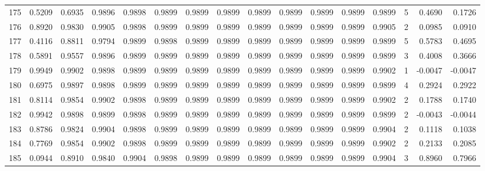 \begin{tabular}{lrrrrrrrrrrrrrrr}
175 &      0.5209 &  0.6935 &  0.9896 &  0.9898 &  0.9899 &  0.9899 &  0.9899 &  0.9899 &  0.9899 &  0.9899 &   0.9899 &     0.9899 &      5 &                    0.4690 &                     0.1726 \\
176 &      0.8920 &  0.9830 &  0.9905 &  0.9898 &  0.9899 &  0.9899 &  0.9899 &  0.9899 &  0.9899 &  0.9899 &   0.9899 &     0.9905 &      2 &                    0.0985 &                     0.0910 \\
177 &      0.4116 &  0.8811 &  0.9794 &  0.9899 &  0.9898 &  0.9899 &  0.9899 &  0.9899 &  0.9899 &  0.9899 &   0.9899 &     0.9899 &      5 &                    0.5783 &                     0.4695 \\
178 &      0.5891 &  0.9557 &  0.9896 &  0.9899 &  0.9899 &  0.9899 &  0.9899 &  0.9899 &  0.9899 &  0.9899 &   0.9899 &     0.9899 &      3 &                    0.4008 &                     0.3666 \\
179 &      0.9949 &  0.9902 &  0.9898 &  0.9899 &  0.9899 &  0.9899 &  0.9899 &  0.9899 &  0.9899 &  0.9899 &   0.9899 &     0.9902 &      1 &                   -0.0047 &                    -0.0047 \\
180 &      0.6975 &  0.9897 &  0.9898 &  0.9899 &  0.9899 &  0.9899 &  0.9899 &  0.9899 &  0.9899 &  0.9899 &   0.9899 &     0.9899 &      4 &                    0.2924 &                     0.2922 \\
181 &      0.8114 &  0.9854 &  0.9902 &  0.9898 &  0.9899 &  0.9899 &  0.9899 &  0.9899 &  0.9899 &  0.9899 &   0.9899 &     0.9902 &      2 &                    0.1788 &                     0.1740 \\
182 &      0.9942 &  0.9898 &  0.9899 &  0.9898 &  0.9899 &  0.9899 &  0.9899 &  0.9899 &  0.9899 &  0.9899 &   0.9899 &     0.9899 &      2 &                   -0.0043 &                    -0.0044 \\
183 &      0.8786 &  0.9824 &  0.9904 &  0.9898 &  0.9899 &  0.9899 &  0.9899 &  0.9899 &  0.9899 &  0.9899 &   0.9899 &     0.9904 &      2 &                    0.1118 &                     0.1038 \\
184 &      0.7769 &  0.9854 &  0.9902 &  0.9898 &  0.9899 &  0.9899 &  0.9899 &  0.9899 &  0.9899 &  0.9899 &   0.9899 &     0.9902 &      2 &                    0.2133 &                     0.2085 \\
185 &      0.0944 &  0.8910 &  0.9840 &  0.9904 &  0.9898 &  0.9899 &  0.9899 &  0.9899 &  0.9899 &  0.9899 &   0.9899 &     0.9904 &      3 &                    0.8960 &                     0.7966 \\

\end{tabular}

